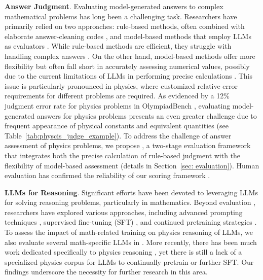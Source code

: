 \textbf{Answer Judgment}.
Evaluating model-generated answers to complex mathematical problems has long been a challenging task. 
Researchers have primarily relied on two approaches: rule-based methods, often combined with elaborate answer-cleaning codes \citep{MATH2021hendrycks, OlympiadBench2024He, PhysicsQA2024jaiswal}, and model-based methods that employ LLMs as evaluators \citep{omnimath2024gao}. 
While rule-based methods are efficient, they struggle with handling complex answers \citep{omnimath2024gao}. 
On the other hand, model-based methods offer more flexibility but often fall short in accurately assessing numerical values, possibly due to the current limitations of LLMs in performing precise calculations \citep{PoT2022Chen, ugmathbench2025xu}. 
This issue is particularly pronounced in physics, where customized relative error requirements for different problems are required.
As evidenced by a 12\% judgment error rate for physics problems in OlympiadBench \citep{OlympiadBench2024He}, evaluating model-generated answers for physics problems presents an even greater challenge due to frequent appearance of physical constants and equivalent quantities (see Table~\ref{tab:physcis_judge_example}).  
To address the challenge of answer assessment of physics problems, we propose {\judge}, a two-stage evaluation framework that integrates both the precise calculation of rule-based judgment with the flexibility of model-based assessment (details in Section~\ref{sec: evaluation}).
Human evaluation has confirmed the reliability of our {\judge} scoring framework .%


\textbf{LLMs for Reasoning}.
Significant efforts have been devoted to leveraging LLMs for solving reasoning problems, particularly in mathematics.
Beyond evaluation \citep{MathBench2024Liu, CollegeMath2024Tang, omnimath2024gao}, researchers have explored various approaches, including advanced prompting techniques \citep{CoT2022Wei, CoT-SC2022Wang}, supervised fine-tuning (SFT) \citep{dartmath2024tong, E-GSM2024Xu}, and continued pretraining strategies \citep{minerva202lewkowycz, llemma2023azerbayev}.
To assess the impact of math-related training on physics reasoning of LLMs, we also evaluate several math-specific LLMs in {\benchmark}.
More recently, there has been much work dedicated specifically to physics reasoning \citep{physicsreasoner2024pang, MoRA2024jaiswal},
yet there is still a lack of a specialized physics corpus for LLMs to continually pretrain or further SFT.
Our findings underscore the necessity for further research in this area.



